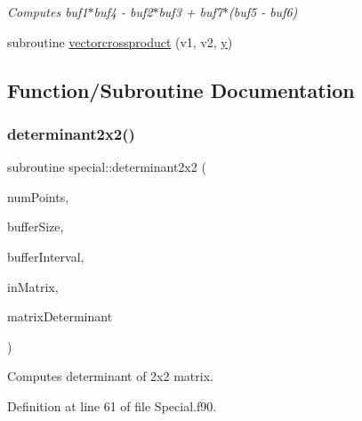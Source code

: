 \begin{DoxyCompactItemize}
\begin{DoxyCompactList}\small\item\em Computes buf1$\ast$buf4 -\/ buf2$\ast$buf3 + buf7$\ast$(buf5 -\/ buf6) \end{DoxyCompactList}\item 
subroutine \hyperlink{namespacespecial_af8feb44102816b409ca0b1d1ea8ae5cc}{vectorcrossproduct} (v1, v2, \hyperlink{SimpleKernels_8H_adbbc84da22c830df0837e7f82eff48d8}{y})
\end{DoxyCompactItemize}


\subsection{Function/\+Subroutine Documentation}
\hypertarget{namespacespecial_ac4a36999d6e685473f363175905ad019}{}\label{namespacespecial_ac4a36999d6e685473f363175905ad019} 
\subsubsection{\texorpdfstring{determinant2x2()}{determinant2x2()}}
{\footnotesize\ttfamily subroutine special\+::determinant2x2 (\begin{DoxyParamCaption}\item[{integer(kind=8), intent(in)}]{num\+Points,  }\item[{integer(kind=8), dimension(2), intent(in)}]{buffer\+Size,  }\item[{integer(kind=8), dimension(4), intent(in)}]{buffer\+Interval,  }\item[{real(kind=8), dimension(4$\ast$numpoints), intent(in)}]{in\+Matrix,  }\item[{real(kind=8), dimension(numpoints), intent(inout)}]{matrix\+Determinant }\end{DoxyParamCaption})}



Computes determinant of 2x2 matrix. 



Definition at line 61 of file Special.\+f90.

\hypertarget{namespacespecial_ab519d39d1e9c73cc816de9bac48f1160}{}\label{namespacespecial_ab519d39d1e9c73cc816de9bac48f1160} 
